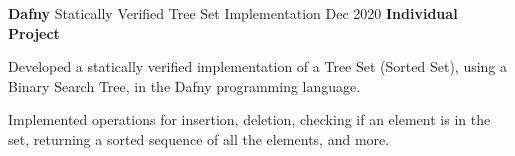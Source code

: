 \cventry
  {\textbf{Dafny}}
  {Statically Verified Tree Set Implementation \href{https://github.com/EduRibeiro00/TreeSetImpl-feup-mfes}{\faExternalLink}} %
  {Dec 2020}
  {\textbf{Individual Project}}
  {
    \begin{cvitems} %
      \item {Developed a statically verified implementation of a Tree Set (Sorted Set), using a Binary Search Tree, in the Dafny programming language.}
      \item {Implemented operations for insertion, deletion, checking if an element is in the set, returning a sorted sequence of all the elements, and more.}
    \end{cvitems}
  }